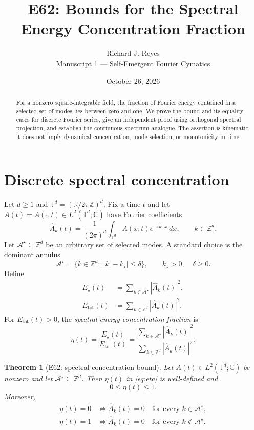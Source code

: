 \documentclass[11pt]{article}
\title{E62: Bounds for the Spectral Energy Concentration Fraction}
\author{Richard J. Reyes\\\small Manuscript 1 --- Self-Emergent Fourier Cymatics}
\date{October 26, 2026}
\newtheorem{theorem}{Theorem}
\newcommand{\T}{\mathbb{T}}
\newcommand{\R}{\mathbb{R}}
\newcommand{\Z}{\mathbb{Z}}
\newcommand{\C}{\mathbb{C}}
\begin{document}
\maketitle

\begin{abstract}
For a nonzero square-integrable field, the fraction of Fourier energy contained in a selected set of modes lies between zero and one. We prove the bound and its equality cases for discrete Fourier series, give an independent proof using orthogonal spectral projection, and establish the continuous-spectrum analogue. The assertion is kinematic: it does not imply dynamical concentration, mode selection, or monotonicity in time.
\end{abstract}

\section{Discrete spectral concentration}

Let $d\geq 1$ and $\T^d=(\R/2\pi\Z)^d$. Fix a time $t$ and let
$A(t)=A(\cdot,t)\in L^2(\T^d;\C)$ have Fourier coefficients
\begin{equation}\label{eq:coeff}
\widehat A_k(t)
=\frac{1}{(2\pi)^d}\int_{\T^d} A(x,t)e^{-ik\cdot x}\,dx,
\qquad k\in\Z^d.
\end{equation}
Let $\mathcal A^\star\subseteq\Z^d$ be an arbitrary set of selected modes.
A standard choice is the dominant annulus
\begin{equation}\label{eq:annulus}
\mathcal A^\star
=\bigl\{k\in\Z^d:\bigl||k|-k_\star\bigr|\leq\delta\bigr\},
\qquad k_\star>0,\quad\delta\geq0.
\end{equation}
Define
\begin{align}
E_\star(t)&=\sum_{k\in\mathcal A^\star}|\widehat A_k(t)|^2,
\label{eq:estar}\\
E_{\mathrm{tot}}(t)&=\sum_{k\in\Z^d}|\widehat A_k(t)|^2.
\label{eq:etotal}
\end{align}
For $E_{\mathrm{tot}}(t)>0$, the \emph{spectral energy concentration fraction} is
\begin{equation}\label{eq:eta}
\boxed{\displaystyle
\eta(t)=\frac{E_\star(t)}{E_{\mathrm{tot}}(t)}
=\frac{\sum_{k\in\mathcal A^\star}|\widehat A_k(t)|^2}
{\sum_{k\in\Z^d}|\widehat A_k(t)|^2}.}
\end{equation}

\begin{theorem}[E62: spectral concentration bound]\label{thm:e62}
Let $A(t)\in L^2(\T^d;\C)$ be nonzero and let
$\mathcal A^\star\subseteq\Z^d$. Then $\eta(t)$ in
\eqref{eq:eta} is well-defined and
\begin{equation}\label{eq:bound}
\boxed{0\leq\eta(t)\leq1.}
\end{equation}
Moreover,
\begin{align}
\eta(t)=0
&\iff \widehat A_k(t)=0\quad\text{for every }k\in\mathcal A^\star,
\label{eq:zero}\\
\eta(t)=1
&\iff \widehat A_k(t)=0\quad\text{for every }k\notin\mathcal A^\star.
\label{eq:one}
\end{align}
\end{theorem}
\end{document}
